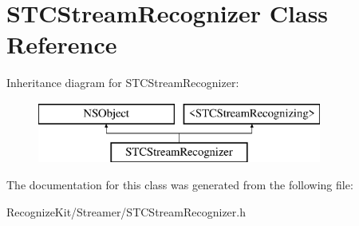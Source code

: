 \hypertarget{interface_s_t_c_stream_recognizer}{}\section{S\+T\+C\+Stream\+Recognizer Class Reference}
\label{interface_s_t_c_stream_recognizer}
Inheritance diagram for S\+T\+C\+Stream\+Recognizer\+:\begin{figure}[H]
\begin{center}
\leavevmode
\includegraphics[height=2.000000cm]{interface_s_t_c_stream_recognizer}
\end{center}
\end{figure}


The documentation for this class was generated from the following file\+:\begin{DoxyCompactItemize}
\item 
Recognize\+Kit/\+Streamer/S\+T\+C\+Stream\+Recognizer.\+h\end{DoxyCompactItemize}

